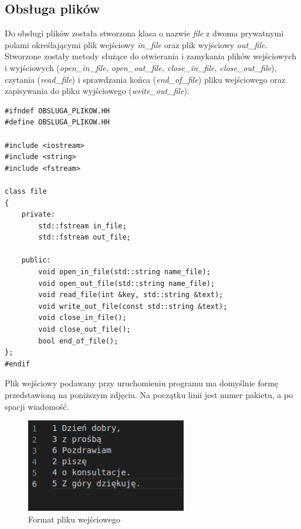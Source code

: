 \documentclass[12pt]{article}
\begin{document}
\subsection{Obsługa plików}
Do obsługi plików została stworzona klasa o nazwie \textit{file} z dwoma prywatnymi polami 
określającymi plik wejściowy \textit{in\_file} oraz plik wyjściowy \textit{out\_file}.
Stworzone zostały metody służące do otwierania i zamykania plików wejściowych i wyjściowych 
(\textit{open\_in\_file, open\_out\_file, close\_in\_file, close\_out\_file}), 
czytania (\textit{read\_file}) i sprawdzania końca (\textit{end\_of\_file}) pliku wejściowego
oraz zapisywania do pliku wyjściowego (\textit{write\_out\_file}).

\begin{lstlisting}
#ifndef OBSLUGA_PLIKOW.HH
#define OBSLUGA_PLIKOW.HH

#include <iostream>
#include <string>
#include <fstream>

class file
{
    private:
        std::fstream in_file;
        std::fstream out_file;

    public:
        void open_in_file(std::string name_file);
        void open_out_file(std::string name_file);
        void read_file(int &key, std::string &text);
        void write_out_file(const std::string &text);
        void close_in_file();
        void close_out_file();
        bool end_of_file();
};
#endif
\end{lstlisting}

Plik wejściowy podawany przy uruchomieniu programu ma domyślnie formę przedstawioną 
na poniższym zdjęciu. Na początku linii jest numer pakietu, a po spacji wiadomość. 

\begin{figure}[H]
    \centering
    \includegraphics[width=7cm]{format_pliku.png}
    \caption{Format pliku wejściowego}
    \label{fig: format_plku}
\end{figure}
\end{document}
